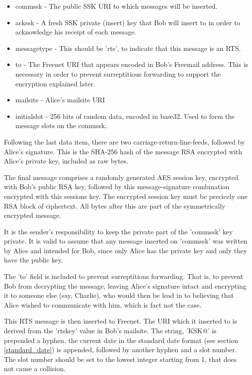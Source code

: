 \documentclass[12pt,a4paper]{article}
\begin{document}
\begin{itemize}
\item commssk - The public SSK URI to which messages will be inserted.
\item ackssk - A fresh SSK private (insert) key that Bob will insert to in order to acknowledge his receipt of each message.
\item messagetype - This should be 'rts', to indicate that this message is an RTS.
\item to - The Freenet URI that appears encoded in Bob's Freemail address. This is necessary in order to prevent surreptitious forwarding to support the encryption explained later.
\item mailsite - Alice's mailsite URI
\item initialslot - 256 bits of random data, encoded in base32. Used to form the message slots on the commssk.
\end{itemize}

Following the last data item, there are two carriage-return-line-feeds, followed by Alice's signature. This is the SHA-256 hash of the message RSA encrypted with Alice's private key, included as raw bytes.

The final message comprises a randomly generated AES session key, encrypted with Bob's public RSA key, followed by this message-signature combination encrypted with this sessions key. The encrypted session key must be precicely one RSA block of ciphertext. All bytes after this are part of the symmetrically encrypted message.

It is the sender's responsibility to keep the private part of the 'commssk' key private. It is valid to assume that any message inserted on 'commssk' was written by Alice and intended for Bob, since only Alice has the private key and only they have the public key.

The 'to' field is included to prevent surreptitious forwarding. That is, to prevent Bob from decrypting the message, leaving Alice's signature intact and encrypting it to someone else (say, Charlie), who would then be lead in to believing that Alice wished to communicate with him, which is fact not the case.

This RTS message is then inserted to Freenet. The URI which it inserted to is derived from the 'rtskey' value in Bob's mailsite. The string, 'KSK@' is prepended a hyphen, the current date in the standard date format (see section \ref{standard_date}) is appended, followed by another hyphen and a slot number. The slot number should be set to the lowest integer starting from 1, that does not cause a collision.
\end{document}
